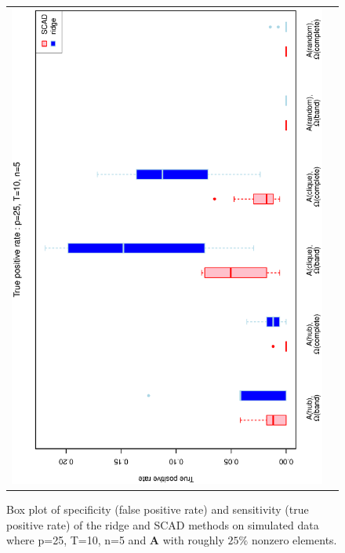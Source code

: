 \documentclass[a4paper]{article}
\begin{document}
\begin{figure}[h!]
\begin{tabular}{cc}
\includegraphics[scale=0.45,angle=270]{ROCtpr25T10N5_25.eps}
\end{tabular}
\caption{Box plot of specificity (false positive rate) and sensitivity (true positive rate) of the ridge and SCAD methods on simulated data where p=25, T=10,  n=5 and $\mathbf{A}$ with roughly $25\%$ nonzero elements.}
\label{figSM:RocP25T10N5_25}
\end{figure}


\end{document}
